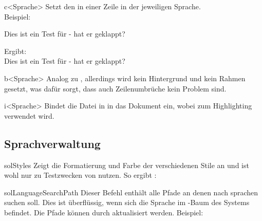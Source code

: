 \documentclass{sopra-base}
\begin{document}
\begin{command}{c<Sprache>}{}
    Setzt den  in einer Zeile in der jeweiligen Sprache. \\
    Beispiel:
    \begin{plainlatex}
Dies ist ein Test für  - hat er geklappt?
    \end{plainlatex}
    Ergibt: \\
Dies ist ein Test für  - hat er geklappt?
\end{command}

\begin{command}{b<Sprache>}{}
   Analog zu , allerdings wird kein Hintergrund und kein Rahmen gesetzt, was dafür sorgt, dass auch Zeilenumbrüche kein Problem sind.
\end{command}

\begin{command}{i<Sprache>}{}
    Bindet die Datei in  in das Dokument ein, wobei  zum Highlighting verwendet wird.
 \end{command}

\subsection{Sprachverwaltung}

\begin{command}{solStyles}{}
    Zeigt die Formatierung und Farbe der verschiedenen Stile an und ist wohl nur zu Testzwecken von nutzen. So ergibt : \solStyles
\end{command}

\begin{command}{solLanguageSearchPath}{}
    Dieser Befehl enthält alle Pfade an denen  nach sprachen suchen soll. Dies ist überflüssig, wenn sich die Sprache im -Baum des Systems befindet. Die Pfade können durch  aktualisiert werden. Beispiel:
\begin{plainlatex}
\renewcommand{\solLanguageSearchPath}{{OrdnerA/}{OrdnerB/UnterordnerA/}{/home/}}
\end{plainlatex}
\end{command}
\end{document}
